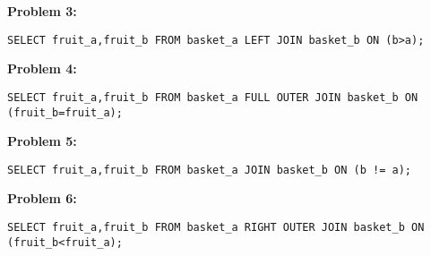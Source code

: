\documentclass[10pt]{article}
\theoremstyle{definition}
\begin{document}
\newpage
\textbf{Problem 3:}
\begin{lstlisting}
SELECT fruit_a,fruit_b FROM basket_a LEFT JOIN basket_b ON (b>a);
\end{lstlisting}

\vspace{3in}
\textbf{Problem 4:}
\begin{lstlisting}
SELECT fruit_a,fruit_b FROM basket_a FULL OUTER JOIN basket_b ON (fruit_b=fruit_a);
\end{lstlisting}

\newpage
\textbf{Problem 5:}
\begin{lstlisting}
SELECT fruit_a,fruit_b FROM basket_a JOIN basket_b ON (b != a);
\end{lstlisting}

\vspace{3in}
\textbf{Problem 6:}
\begin{lstlisting}
SELECT fruit_a,fruit_b FROM basket_a RIGHT OUTER JOIN basket_b ON (fruit_b<fruit_a);
\end{lstlisting}
\end{document}
